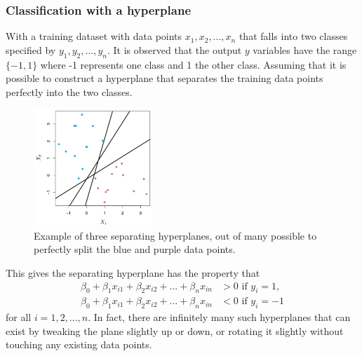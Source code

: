 \documentclass[CS5104-Notes.tex]{subfiles}
\begin{document}
\subsubsection{Classification with a hyperplane}
With a training dataset with data points $x_{1}, x_{2}, ..., x_{n}$ that falls into two classes specified by $y_{1}, y_{2}, ..., y_{n}$. It is observed that the output $y$ variables have the range $\{-1, 1\}$ where -1 represents one class and 1 the other class. Assuming that it is possible to construct a hyperplane that separates the training data points perfectly into the two classes.
\begin{figure}[H]
  \centering
  \includegraphics[width=0.4\textwidth, keepaspectratio]{imgs/separating-hyperplanes.png}
  \caption{Example of three separating hyperplanes, out of many possible to perfectly split the blue and purple data points.}
\end{figure}
\noindent
This gives the separating hyperplane has the property that
\begin{align}
  \beta_{0} + \beta_{1}x_{i1} + \beta_{2}x_{i2} + ... + \beta_{n}x_{in} &> 0 \text{ if } y_{i} = 1, \\
  \beta_{0} + \beta_{1}x_{i1} + \beta_{2}x_{i2} + ... + \beta_{n}x_{in} &< 0 \text{ if } y_{i} = -1
\end{align}
for all $i = 1,2,...,n$. In fact, there are infinitely many such hyperplanes that can exist by tweaking the plane slightly up or down, or rotating it slightly without touching any existing data points.
\end{document}
